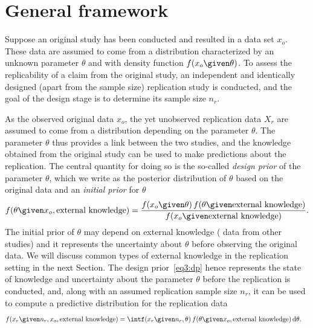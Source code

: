 \section{General framework} \label{sec3:GFW}

Suppose an original study has been conducted and resulted in a data set $x_{o}$.
These data are assumed to come from a distribution characterized by an unknown
parameter $\theta$ and with density function $f(x_{o} \given \theta)$. To assess
the replicability of a claim from the original study, an independent and
identically designed (apart from the sample size) replication study is
conducted, and the goal of the design stage is to determine its sample size
$n_{r}$.

As the observed original data $x_{o}$, the yet unobserved replication data
$X_{r}$ are assumed to come from a distribution depending on the parameter
$\theta$. The parameter $\theta$ thus provides a link between the two studies,
and the knowledge obtained from the original study can be used to make
predictions about the replication. The central quantity for doing so is the
so-called \emph{design prior} of the parameter $\theta$, which we write as the
posterior distribution of $\theta$ based on the original data and an
\emph{initial prior} for $\theta$
\begin{align}
  \label{eq3:dp}
  f(\theta \given x_o, \text{external knowledge}) =
  \frac{f(x_o \given \theta) \, f(\theta \given \text{external knowledge})}{f(x_o \given
  \text{external knowledge})}.
\end{align}
The initial prior of $\theta$ may depend on external knowledge (\eg{} data from
other studies) and it represents the uncertainty about $\theta$ before observing
the original data. We will discuss common types of external knowledge in the
replication setting in the next Section. %
The design prior~\eqref{eq3:dp} hence represents the state of knowledge and
uncertainty about the parameter $\theta$ before the replication is conducted,
and, along with an assumed replication sample size $n_{r}$, it can be used to
compute a predictive distribution for the replication data
\begin{align}
  \label{eq3:ftr}
  f(x_r \given n_r, x_o, \text{external knowledge})
  &= \int%
    f(x_r \given n_{r}, \theta)
    \, f(\theta \given x_o, \text{external knowledge})
    \, \text{d}\theta.
\end{align}

